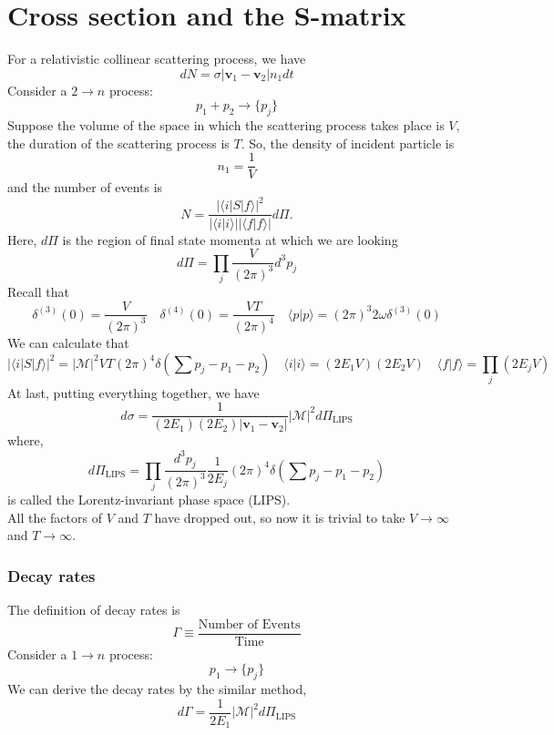\section{Cross section and the S-matrix}
\noindent
For a relativistic collinear scattering process, we have
\[dN = \sigma |\bm{v}_1 - \bm{v}_2| n_1 dt\]
Consider a  $2 \to n$ process:
\[p_1 + p_2 \to \{p_j\}\]
Suppose the volume of the space in which the scattering process takes place is $V$, the duration of the scattering process is $T$. 
So, the density of incident particle is
\[n_1 = \frac{1}{V}\]
and the number of events is
\[N = \frac{|\langle i | S | f \rangle|^2}{|\langle i | i \rangle||\langle f | f \rangle|} d\Pi .\]
Here, $d\Pi$ is the region of final state momenta at which we are looking
\[d\Pi = \prod_j \frac{V}{(2\pi)^3} d^3 p_j\]
Recall that
\[\delta^{(3)}(0) = \frac{V}{(2\pi)^3} \quad \delta^{(4)}(0) = \frac{VT}{(2\pi)^4} \quad \langle p | p \rangle = (2\pi)^3 2\omega \delta^{(3)}(0)\]
We can calculate that
\[|\langle i | S | f \rangle|^2 = |\mathcal{M}|^2 VT (2\pi)^4 \delta(\sum p_j - p_1 - p_2) \quad \langle i | i \rangle = (2E_1V) (2E_2V) \quad \langle f | f \rangle = \prod_j (2E_jV)\]
At last, putting everything together, we have
\[d\sigma = \frac{1}{(2E_1)(2E_2)|\bm{v}_1-\bm{v}_2|} |\mathcal{M}|^2 d\Pi_{\mathrm{LIPS}}\]
where,
\[d\Pi_{\mathrm{LIPS}} = \prod_j \frac{d^3p_j}{(2\pi)^3} \frac{1}{2E_j} (2\pi)^4 \delta(\sum p_j - p_1 - p_2)\]
is called the Lorentz-invariant phase space (LIPS). \\
All the factors of $V$ and $T$ have dropped out, so now it is trivial to take $V \to \infty$ and $T \to \infty$. 

\subsubsection{Decay rates}
\noindent
The definition of decay rates is
\[\Gamma \equiv \frac{\mbox{Number of Events}}{\mbox{Time}}\]
Consider a  $1 \to n$ process:
\[p_1 \to \{p_j\}\]
We can derive the decay rates by the similar method,
\[d\Gamma = \frac{1}{2E_1} |\mathcal{M}|^2 d\Pi_{\mathrm{LIPS}} \]

